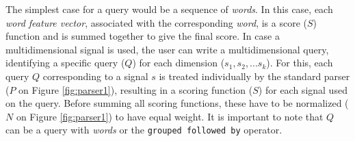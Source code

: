 The simplest case for a query would be a sequence of \textit{words}. In this case, each \textit{word feature vector},  associated with the corresponding \textit{word}, is a score ($S$) function and is summed together to give the final score. In case a multidimensional signal is used, the user can write a multidimensional query, identifying a specific query ($Q$) for each dimension ($s_1, s_2,...s_k$). For this, each query $Q$ corresponding to a signal $s$ is treated individually by the standard parser ($P$ on Figure \ref{fig:parser1}), resulting in a scoring function ($S$) for each signal used on the query. Before summing all scoring functions, these have to be normalized ($N$ on Figure \ref{fig:parser1}) to have equal weight. It is important to note that $Q$ can be a query with \textit{words} or the \texttt{grouped followed by} operator.

